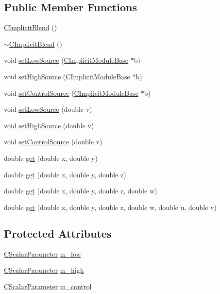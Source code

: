 \subsection*{Public Member Functions}
\begin{DoxyCompactItemize}
\item 
\hyperlink{classanl_1_1CImplicitBlend_a930f26a45156be0e9c07e6cb05109cb7}{CImplicitBlend} ()
\item 
\hyperlink{classanl_1_1CImplicitBlend_a1a0fb69088bc30effa5ffc64c1b57b16}{$\sim$CImplicitBlend} ()
\item 
void \hyperlink{classanl_1_1CImplicitBlend_a1336590cf2e56460e1d6f574cacefc78}{setLowSource} (\hyperlink{classanl_1_1CImplicitModuleBase}{CImplicitModuleBase} $\ast$b)
\item 
void \hyperlink{classanl_1_1CImplicitBlend_a258367726a0178a5a5c081cfa8523426}{setHighSource} (\hyperlink{classanl_1_1CImplicitModuleBase}{CImplicitModuleBase} $\ast$b)
\item 
void \hyperlink{classanl_1_1CImplicitBlend_a398b48040362178032cc32d08f43a7f2}{setControlSource} (\hyperlink{classanl_1_1CImplicitModuleBase}{CImplicitModuleBase} $\ast$b)
\item 
void \hyperlink{classanl_1_1CImplicitBlend_a683d50ea2c9852cab8737158e22a478b}{setLowSource} (double v)
\item 
void \hyperlink{classanl_1_1CImplicitBlend_addfd0053647b22d2b8c7c1599e46fadf}{setHighSource} (double v)
\item 
void \hyperlink{classanl_1_1CImplicitBlend_a8839f537a0b91cfa83b7860da4184ea2}{setControlSource} (double v)
\item 
double \hyperlink{classanl_1_1CImplicitBlend_a24ce6a5991691901f1db4d8c7a78089e}{get} (double x, double y)
\item 
double \hyperlink{classanl_1_1CImplicitBlend_a446d55152cda96d074d03055383c7f0d}{get} (double x, double y, double z)
\item 
double \hyperlink{classanl_1_1CImplicitBlend_ac3d285ae9ab47e299c706b2357e3b179}{get} (double x, double y, double z, double w)
\item 
double \hyperlink{classanl_1_1CImplicitBlend_a9d40ee4d97dac37b2a6aea498c7b7418}{get} (double x, double y, double z, double w, double u, double v)
\end{DoxyCompactItemize}
\subsection*{Protected Attributes}
\begin{DoxyCompactItemize}
\item 
\hyperlink{classanl_1_1CScalarParameter}{CScalarParameter} \hyperlink{classanl_1_1CImplicitBlend_ae9ee878c842a67b1128096d7c6617693}{m\_\-low}
\item 
\hyperlink{classanl_1_1CScalarParameter}{CScalarParameter} \hyperlink{classanl_1_1CImplicitBlend_a7d9ed78bd768066bb4af97f7bfc8e1aa}{m\_\-high}
\item 
\hyperlink{classanl_1_1CScalarParameter}{CScalarParameter} \hyperlink{classanl_1_1CImplicitBlend_aaa683ecf2fdc69454c27b9437e54b1b6}{m\_\-control}
\end{DoxyCompactItemize}


